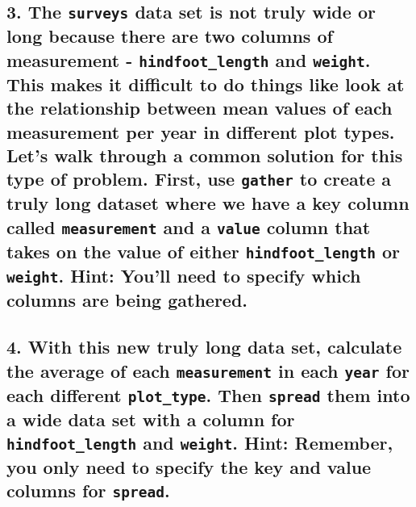 \documentclass[]{article}
\begin{document}
\subsection{\texorpdfstring{3. The \texttt{surveys} data set is not
truly wide or long because there are two columns of measurement -
\texttt{hindfoot\_length} and \texttt{weight}. This makes it difficult
to do things like look at the relationship between mean values of each
measurement per year in different plot types. Let's walk through a
common solution for this type of problem. First, use \texttt{gather} to
create a truly long dataset where we have a key column called
\texttt{measurement} and a \texttt{value} column that takes on the value
of either \texttt{hindfoot\_length} or \texttt{weight}. Hint: You'll
need to specify which columns are being
gathered.}{3. The surveys data set is not truly wide or long because there are two columns of measurement - hindfoot\_length and weight. This makes it difficult to do things like look at the relationship between mean values of each measurement per year in different plot types. Let's walk through a common solution for this type of problem. First, use gather to create a truly long dataset where we have a key column called measurement and a value column that takes on the value of either hindfoot\_length or weight. Hint: You'll need to specify which columns are being gathered.}}\label{the-surveys-data-set-is-not-truly-wide-or-long-because-there-are-two-columns-of-measurement---hindfoot_length-and-weight.-this-makes-it-difficult-to-do-things-like-look-at-the-relationship-between-mean-values-of-each-measurement-per-year-in-different-plot-types.-lets-walk-through-a-common-solution-for-this-type-of-problem.-first-use-gather-to-create-a-truly-long-dataset-where-we-have-a-key-column-called-measurement-and-a-value-column-that-takes-on-the-value-of-either-hindfoot_length-or-weight.-hint-youll-need-to-specify-which-columns-are-being-gathered.}

\subsection{\texorpdfstring{4. With this new truly long data set,
calculate the average of each \texttt{measurement} in each \texttt{year}
for each different \texttt{plot\_type}. Then \texttt{spread} them into a
wide data set with a column for \texttt{hindfoot\_length} and
\texttt{weight}. Hint: Remember, you only need to specify the key and
value columns for
\texttt{spread}.}{4. With this new truly long data set, calculate the average of each measurement in each year for each different plot\_type. Then spread them into a wide data set with a column for hindfoot\_length and weight. Hint: Remember, you only need to specify the key and value columns for spread.}}\label{with-this-new-truly-long-data-set-calculate-the-average-of-each-measurement-in-each-year-for-each-different-plot_type.-then-spread-them-into-a-wide-data-set-with-a-column-for-hindfoot_length-and-weight.-hint-remember-you-only-need-to-specify-the-key-and-value-columns-for-spread.}
\end{document}
